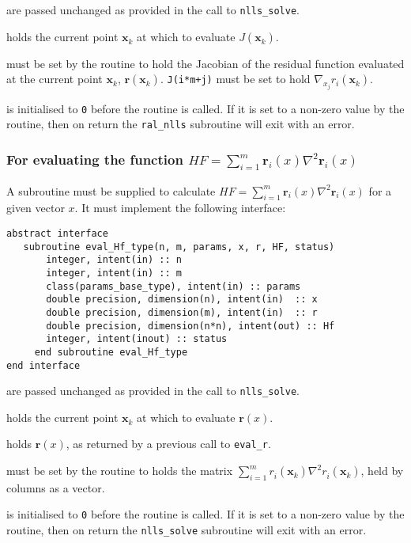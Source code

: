 \documentclass{spec}
\newcommand{\vx}{ {\bm x} } %
\newcommand{\vr}{ {\bm r} } %
\newcommand{\iter}[2][k]{ #2_{#1}^{}} %
\newcommand{\comp}[2][i]{ #2_{#1}^{}} %
\begin{document}
\begin{description}
    are passed unchanged as provided in the call to
      {\tt nlls\_solve}.

    holds the current point $\iter{\vx}$ at which to evaluate
      $J(\iter{\vx})$.
  
    must be set by the routine to hold the Jacobian of the residual
      function evaluated at the current point $\iter{\vx}$, $\vr(\iter{\vx})$.
      \texttt{J(i*m+j)} must be set to hold $\nabla_{x_j} r_i(\iter{\vx})$.
       
    is initialised to \texttt{0} before the routine is
      called. If it is set to a non-zero value by the routine, then on return
      the {\tt ral\_nlls} subroutine will exit with an error.
\end{description}

\subsubsection{For evaluating the function $HF = \sum_{i=1}^m \vr_i(x) \nabla^2 \vr_i(x)$}
A subroutine must be supplied to calculate $HF = \sum_{i=1}^m \vr_i(x) \nabla^2 \vr_i(x)$ for a given vector $x$. It must implement the following interface:

\begin{verbatim}
abstract interface
   subroutine eval_Hf_type(n, m, params, x, r, HF, status)
       integer, intent(in) :: n
       integer, intent(in) :: m
       class(params_base_type), intent(in) :: params
       double precision, dimension(n), intent(in)  :: x
       double precision, dimension(m), intent(in)  :: r
       double precision, dimension(n*n), intent(out) :: Hf
       integer, intent(inout) :: status
     end subroutine eval_Hf_type
end interface
\end{verbatim}

\begin{description}
    are passed unchanged as provided in the call to
      {\tt nlls\_solve}.

    holds the current point $\iter{\vx}$ at which to evaluate $\vr(x)$.
  
    holds $\vr(x)$, as returned by a previous call to \texttt{eval\_r}.

    must be set by the routine to holds the matrix
      $\sum_{i = 1}^m \comp{r}(\iter{\vx})\nabla^2\comp{r}(\iter{\vx})$, held
      by columns as a vector.

    is initialised to \texttt{0} before the routine is called.
      If it is set to a non-zero value by the routine, then on return
      the {\tt nlls\_solve} subroutine will exit with an error.
\end{description}
\end{document}
